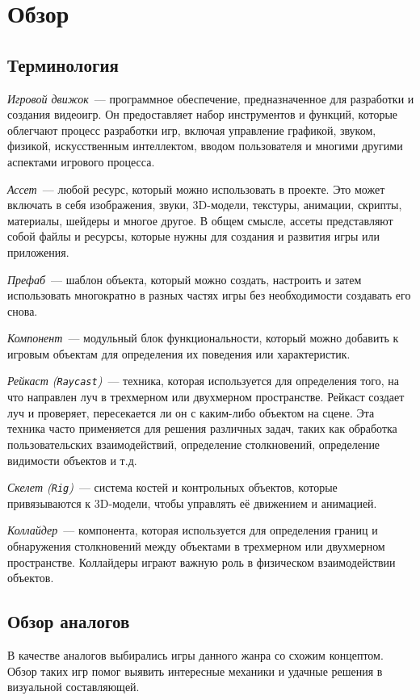 
\section{Обзор}
\label{sec:relatedworks}

\subsection{Терминология}
\textit{Игровой движок}~--- программное обеспечение, предназначенное для разработки и создания видеоигр. Он предоставляет набор инструментов и функций, которые облегчают процесс разработки игр, включая управление графикой, звуком, физикой, искусственным интеллектом, вводом пользователя и многими другими аспектами игрового процесса.

\textit{Ассет}~--- любой ресурс, который можно использовать в проекте. Это может включать в себя изображения, звуки, 3D-модели, текстуры, анимации, скрипты, материалы, шейдеры и многое другое. В общем смысле, ассеты представляют собой файлы и ресурсы, которые нужны для создания и развития игры или приложения.

\textit{Префаб}~--- шаблон объекта, который можно создать, настроить и затем использовать многократно в разных частях игры без необходимости создавать его снова.

\textit{Компонент}~--- модульный блок функциональности, который можно добавить к игровым объектам для определения их поведения или характеристик.

\textit{Рейкаст (\texttt{Raycast})}~--- техника, которая используется для определения того, на что направлен луч в трехмерном или двухмерном пространстве. Рейкаст создает луч и проверяет, пересекается ли он с каким-либо объектом на сцене. Эта техника часто применяется для решения различных задач, таких как обработка пользовательских взаимодействий, определение столкновений, определение видимости объектов и т.д.

\textit{Скелет (\texttt{Rig})}~--- система костей и контрольных объектов, которые привязываются к 3D-модели, чтобы управлять её движением и анимацией.

\textit{Коллайдер}~--- компонента, которая используется для определения границ и обнаружения столкновений между объектами в трехмерном или двухмерном пространстве. Коллайдеры играют важную роль в физическом взаимодействии объектов.


\subsection{Обзор аналогов}
В качестве аналогов выбирались игры данного жанра со схожим концептом. Обзор таких игр помог выявить интересные механики и удачные решения в визуальной составляющей.

